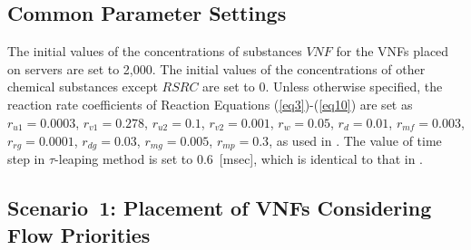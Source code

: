 \documentclass[technicalreport]{ieicej}
\begin{document}
	\subsection{Common Parameter Settings}
	The initial values of the concentrations of substances $\mathit{VNF}$ for the VNFs placed on servers are set to 2,000.
	The initial values of the concentrations of other chemical substances except $\mathit{RSRC}$ are set to 0.
	Unless otherwise specified, the reaction rate coefficients of Reaction Equations (\ref{eq3})-(\ref{eq10}) are set as $\mathit{r_{u1}}=0.0003$, $\mathit{r_{v1}}=0.278$, $\mathit{r_{u2}}=0.1$, $\mathit{r_{v2}}=0.001$, $\mathit{r_{w}}=0.05$, $\mathit{r_{d}}=0.01$, $\mathit{r_{mf}}=0.003$, $\mathit{r_{rg}}=0.0001$, $\mathit{r_{dg}}=0.03$, $\mathit{r_{mg}}=0.005$, $\mathit{r_{mp}}=0.3$, as used in \cite{kokisakata2018masterthesis}.
	The value of time step in $\tau$-leaping method is set to 0.6~[msec], which is identical to that in \cite{kokisakata2018masterthesis}.

	\subsection{Scenario~1: Placement of VNFs Considering Flow Priorities}
\end{document}
